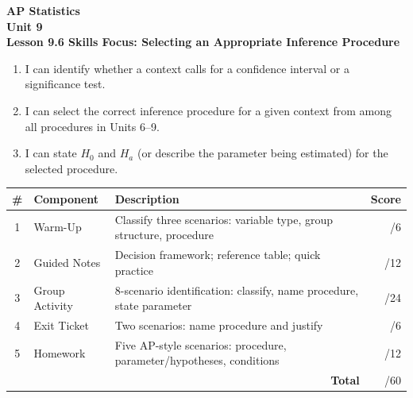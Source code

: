 \documentclass[10pt]{article}
\begin{document}
\vspace{-0.8in}

\begin{center}
  {\color{white}\textbf{\LARGE AP Statistics}}\\[4pt]
  {\color{skymid}\large\textbf{Unit 9}}\\[6pt]
  {\color{white}\textbf{\large Lesson 9.6 \quad Skills Focus: Selecting an Appropriate Inference Procedure}}
\end{center}

\vspace{0.22in}
\namedateperiod
\vspace{0.18in}

\begin{learningtargetbox}
\small
\begin{enumerate}[leftmargin=1.5em, itemsep=5pt]
  \item I can identify whether a context calls for a confidence interval or a significance test.
  \item I can select the correct inference procedure for a given context from among all
        procedures in Units 6--9.
  \item I can state $H_0$ and $H_a$ (or describe the parameter being estimated) for the
        selected procedure.
\end{enumerate}
\end{learningtargetbox}

\vspace{0.14in}

\begin{tocbox}
\small
\renewcommand{\arraystretch}{1.5}
\begin{tabularx}{\linewidth}{@{} c l X r @{}}
\rowcolor{sky}
\textbf{\#} & \textbf{Component} & \textbf{Description} & \textbf{Score} \\
\midrule
1 & Warm-Up        & Classify three scenarios: variable type, group structure, procedure & \hfill/6 \\
2 & Guided Notes   & Decision framework; reference table; quick practice & \hfill/12 \\
3 & Group Activity & 8-scenario identification: classify, name procedure, state parameter & \hfill/24 \\
4 & Exit Ticket    & Two scenarios: name procedure and justify & \hfill/6 \\
5 & Homework       & Five AP-style scenarios: procedure, parameter/hypotheses, conditions & \hfill/12 \\
\midrule
  & \multicolumn{2}{r}{\textbf{Total}} & \hfill/60 \\
\end{tabularx}
\end{tocbox}
\end{document}
